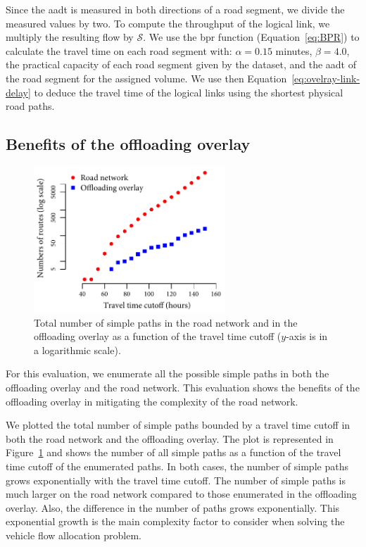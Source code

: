 Since the \acrshort{aadt} is measured in both directions of a road segment, we divide the measured values by two. To compute the throughput of the logical link, we multiply the resulting flow by $\mathcal{S}$. We use the \acrshort{bpr} function (Equation~\ref{eq:BPR}) to calculate the travel time on each road segment with: $\alpha = 0.15$ minutes, $\beta = 4.0$, the practical capacity of each road segment given by the dataset, and the \acrshort{aadt} of the road segment for the assigned volume. We use then Equation~\ref{eq:ovelray-link-delay} to deduce the travel time of the logical links using the shortest physical road paths.


\subsection{Benefits of the offloading overlay}
\label{sec:complexity-offloading-overlay}


\begin{figure}
    \vspace{-15pt}
    \includegraphics[width=7.2cm]{results/pathcount.pdf}
    \caption{Total number of simple paths in the road network and in the offloading overlay as a function of the travel time cutoff ($y$-axis is in a logarithmic scale).}
    \label{fig:pathcount}
\end{figure}
For this evaluation, we enumerate all the possible simple paths in both the offloading overlay and the road network. This evaluation shows the benefits of the offloading overlay in mitigating the complexity of the road network. 

We plotted the total number of simple paths bounded by a travel time cutoff in both the road network and the offloading overlay. The plot is represented in Figure~\ref{fig:pathcount} and shows the number of all simple paths as a function of the travel time cutoff of the enumerated paths. In both cases, the number of simple paths grows exponentially with the travel time cutoff. The number of simple paths is much larger on the road network compared to those enumerated in the offloading overlay. Also, the difference in the number of paths grows exponentially. This exponential growth is the main complexity factor to consider when solving the vehicle flow allocation problem.


